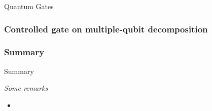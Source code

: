 \documentclass[9pt]{beamer}
\begin{document}
\begin{section}{Quantum Gates}
\begin{frame}
        \end{frame}
        \begin{frame}
            \frametitle{Controlled gate on multiple-qubit decomposition}
        
            
        
        \end{frame}

        \begin{frame}
            \frametitle{Summary}
            \begin{block}{Summary}
                
            \end{block}
            \vspace{0.2cm}
            \textit{Some remarks}
            \begin{itemize}
                \item 
            \end{itemize}
            
        
        \end{frame}

    \end{section}
\end{document}
